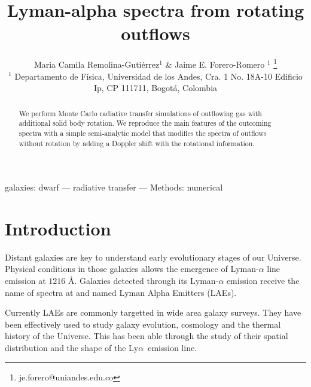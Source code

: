 \documentclass[a4paper,fleqn,usenatbib]{mnras}
\newcommand{\lya}{\ifmmode{{\rm Ly}\alpha}\else Ly$\alpha$\ \fi}
\begin{document}
\title[Outflows and rotation in LAEs]{
Lyman-alpha spectra from rotating outflows}
\author[M.C. Remolina-Gutierrez \& J.E. Forero-Romero]{
  Maria Camila Remolina-Guti\'errez$^1$ \&
  Jaime E. Forero-Romero $^{1}$ \thanks{je.forero@uniandes.edu.co}\\
  $^1$ Departamento de F\'isica, Universidad de los Andes, Cra. 1
  No. 18A-10 Edificio Ip, CP 111711, Bogot\'a, Colombia \\
}

\maketitle
      
\begin{abstract}
We perform Monte Carlo radiative transfer simulations of outflowing
gas with additional solid body rotation.
We reproduce the main features of the outcoming spectra with a simple
semi-analytic model that modifies the spectra of outflows without
rotation by adding a Doppler shift with the rotational information.

\end{abstract}

\begin{keywords}
galaxies: dwarf --- radiative transfer --- Methods: numerical 
\end{keywords}




\section{Introduction}
\label{sec:intro}

Distant galaxies are key to understand early evolutionary stages of
our Universe.
Physical conditions in those galaxies allows the emergence of
Lyman-$\alpha$ line emission at $1216$ \AA \cite{PartrigePeebles}.
Galaxies detected through its Lyman-$\alpha$ emission receive the name of
spectra at  and named Lyman Alpha Emitters (LAEs).

Currently LAEs are commonly targetted in wide area galaxy surveys.
They have been effectively used to study galaxy evolution,
cosmology and the thermal history of the Universe.
This has been able through the study of their spatial distribution and
the shape of the \lya emission line.
\end{document}
